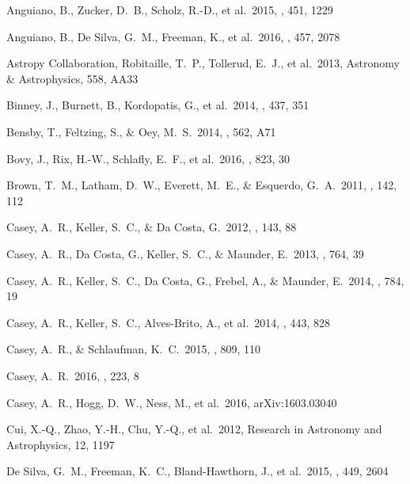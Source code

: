 \documentclass[preprint,trackchanges]{aastex}
\begin{document}
\begin{thebibliography}{dummy}
 Anguiano, B., Zucker, D.~B., Scholz, R.-D., et al.\ 2015, \mnras, 451, 1229 

 Anguiano, B., De Silva, G.~M., Freeman, K., et al.\ 2016, \mnras, 457, 2078 

 Astropy Collaboration, Robitaille, T.~P., Tollerud, E.~J., et al.\ 2013, Astronomy \& Astrophysics, 558, AA33

 Binney, J., Burnett, B., Kordopatis, G., et al.\ 2014, \mnras, 437, 351 

 Bensby, T., Feltzing, S., \& Oey, M.~S.\ 2014, \aap, 562, A71 

 Bovy, J., Rix, H.-W., Schlafly, E.~F., et al.\ 2016, \apj, 823, 30 

 Brown, T.~M., Latham, D.~W., Everett, M.~E., \& Esquerdo, G.~A.\ 2011, \aj, 142, 112 

 Casey, A.~R., Keller, S.~C., \& Da Costa, G.\ 2012, \aj, 143, 88 

 Casey, A.~R., Da Costa, G., Keller, S.~C., \& Maunder, E.\ 2013, \apj, 764, 39 

 Casey, A.~R., Keller, S.~C., Da Costa, G., Frebel, A., \& Maunder, E.\ 2014, \apj, 784, 19 

 Casey, A.~R., Keller, S.~C., Alves-Brito, A., et al.\ 2014, \mnras, 443, 828 

 Casey, A.~R., \& Schlaufman, K.~C.\ 2015, \apj, 809, 110 

 Casey, A.~R.\ 2016, \apjs, 223, 8 

 Casey, A.~R., Hogg, D.~W., Ness, M., et al.\ 2016, arXiv:1603.03040 

 Cui, X.-Q., Zhao, Y.-H., Chu, Y.-Q., et al.\ 2012, Research in Astronomy and Astrophysics, 12, 1197 

 De Silva, G.~M., Freeman, K.~C., Bland-Hawthorn, J., et al.\ 2015, \mnras, 449, 2604 


\end{thebibliography}
\end{document}
